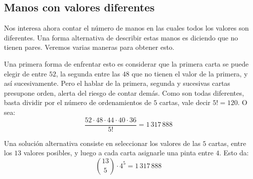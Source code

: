 \subsection{Manos con valores diferentes}
\label{sec:poker-different-values}

  Nos interesa ahora contar el número de manos
  en las cuales todos los valores son diferentes.
  Una forma alternativa de describir estas manos
  es diciendo que no tienen pares.
  Veremos varias maneras para obtener esto.

  Una primera forma de enfrentar esto
  es considerar
  que la primera carta se puede elegir de entre \(52\),
  la segunda entre las \(48\) que no tienen el valor de la primera,
  y así sucesivamente.
  Pero el hablar de la primera, segunda y sucesivas cartas
  presupone orden,
  alerta del riesgo de contar demás.%
  Como son todas diferentes,
  basta dividir por el número de ordenamientos de \(5\) cartas,
  vale decir \(5! = 120\).
  O sea:
  \begin{equation*}
    \frac{52 \cdot 48 \cdot 44 \cdot 40 \cdot 36}{5!}
      = 1\,317\,888
  \end{equation*}

  Una solución alternativa
  consiste en seleccionar los valores de las \(5\) cartas,
  entre los \(13\) valores posibles,
  y luego a cada carta asignarle una pinta entre \(4\).
  Esto da:
  \begin{equation*}
    \binom{13}{5} \cdot 4^5
      = 1\,317\,888
  \end{equation*}

